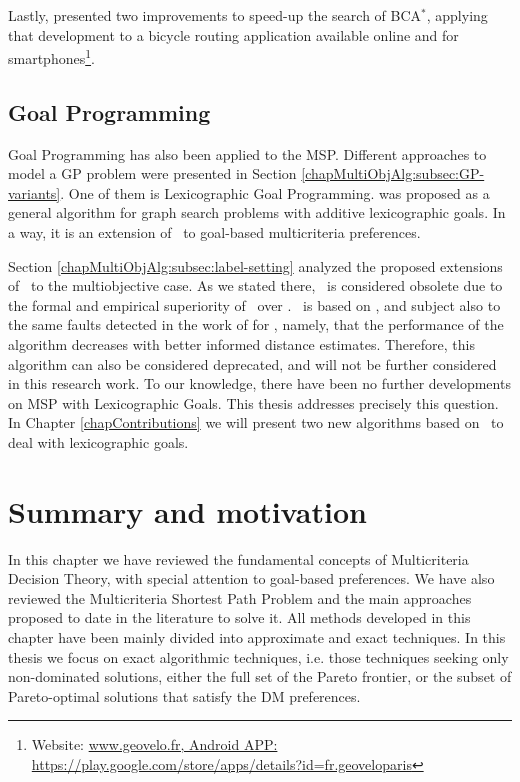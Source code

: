 Lastly, \citet{Sauvanet2010} presented two improvements to speed-up the search of BCA$^*$, applying that development to a bicycle routing application available online and for smartphones\footnote{Website: \url{www.geovelo.fr, Android APP: https://play.google.com/store/apps/details?id=fr.geoveloparis}}.

\subsection{Goal Programming}
\label{chapMultiObjAlg:subsec:goal-programming}

Goal Programming has also been applied to the MSP. Different approaches to model a GP problem were presented in Section \ref{chapMultiObjAlg:subsec:GP-variants}. One of them is Lexicographic Goal Programming. \metal \citep{Mandow2001} was proposed as a general algorithm for graph search problems with additive lexicographic goals. In a way, it is an extension of \astar \ to goal-based multicriteria preferences.

Section \ref{chapMultiObjAlg:subsec:label-setting} analyzed the proposed extensions of \astar \ to the multiobjective case. As we stated there, \moa \ is considered obsolete due to the formal and empirical superiority of \namoa \ over \moa. \metal \ is based on \moa, and subject also to the same faults detected in the work of \citet{PerezdelaCruz2013} for \moa, namely, that the performance of the algorithm decreases with better informed distance estimates. Therefore, this algorithm can also be considered deprecated, and will not be further considered in this research work. To our knowledge, there have been no further developments on MSP with Lexicographic Goals. This thesis addresses precisely this question. In Chapter \ref{chapContributions} we will present two new algorithms based on \namoa \ to deal with lexicographic goals. 

\section{Summary and motivation}
\label{chapMultiObjAlg:sec:summary}

In this chapter we have reviewed the fundamental concepts of Multicriteria Decision Theory, with special attention to goal-based preferences. We have also reviewed the Multicriteria Shortest Path Problem and the main approaches proposed to date in the literature to solve it. All methods developed in this chapter have been mainly divided into approximate and exact techniques. In this thesis we focus on exact algorithmic techniques, i.e. those techniques seeking only non-dominated solutions, either the full set of the Pareto frontier, or the subset of Pareto-optimal solutions that satisfy the DM preferences. 

